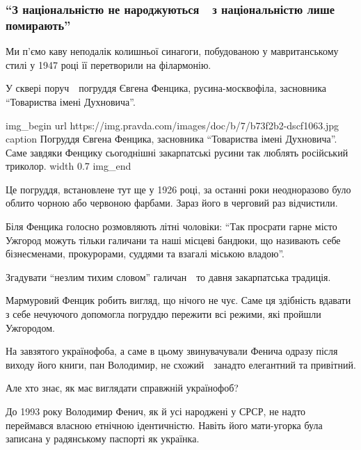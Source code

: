  
 
 

\subsubsection{\enquote{З національністю не народжуються\ \textemdash\ з національністю лише
помирають}}

Ми п’ємо каву неподалік колишньої синагоги, побудованою у мавританському стилі \dshM у 1947 році її перетворили на філармонію.

У сквері поруч\ \textemdash\ погруддя Євгена Фенцика, русина-москвофіла, засновника
\enquote{Товариства імені Духновича}.

\ifcmt
img_begin 
        url https://img.pravda.com/images/doc/b/7/b73f2b2-dscf1063.jpg
        caption Погруддя Євгена Фенцика, засновника \enquote{Товариства імені Духновича}. Саме завдяки Фенцику сьогоднішні закарпатські русини так люблять російський триколор.
        width 0.7
img_end
\fi

Це погруддя, встановлене тут ще у 1926 році, за останні роки неодноразово було
облито чорною або червоною фарбами. Зараз його в черговий раз відчистили.

Біля Фенцика голосно розмовляють літні чоловіки: \enquote{Так просрати гарне місто
Ужгород можуть тільки галичани та наші місцеві бандюки, що називають себе
бізнесменами, прокурорами, суддями та взагалі міською владою}.

Згадувати \enquote{незлим тихим словом} галичан\ \textemdash\ то давня закарпатська традиція.

Мармуровий Фенцик робить вигляд, що нічого не чує. Саме ця здібність вдавати з
себе нечуючого допомогла погруддю пережити всі режими, які пройшли Ужгородом.

На завзятого українофоба, а саме в цьому звинувачували Фенича одразу після
виходу його книги, пан Володимир, не схожий\ \textemdash\ занадто елегантний та привітний.

Але хто знає, як має виглядати справжній українофоб?

До 1993 року Володимир Фенич, як й усі народжені у СРСР, не надто переймався
власною етнічною ідентичністю. Навіть його мати-угорка була записана у
радянському паспорті як українка. 

